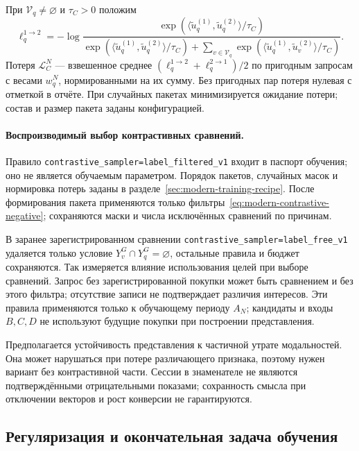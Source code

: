 \documentclass[12pt,a4paper]{article}
\newcommand{\code}[1]{{\ttfamily\small\nolinkurl{#1}}}
\theoremstyle{plainru}
\begin{document}
При $\mathcal V_q\ne\varnothing$ и $\tau_C>0$ положим
\begin{equation}\label{eq:modern-contrastive-loss}
\ell_q^{1\to2}=-\log
\frac{\exp(\langle\tilde u_q^{(1)},\tilde u_q^{(2)}\rangle/\tau_C)}
{\exp(\langle\tilde u_q^{(1)},\tilde u_q^{(2)}\rangle/\tau_C)
+\sum_{v\in\mathcal V_q}
\exp(\langle\tilde u_q^{(1)},\tilde u_v^{(2)}\rangle/\tau_C)}.
\end{equation}
Потеря $\mathcal L_C^N$ --- взвешенное среднее
$(\ell_q^{1\to2}+\ell_q^{2\to1})/2$ по пригодным запросам
с весами $w_q^N$, нормированными на их сумму.
Без пригодных пар потеря нулевая с отметкой в отчёте.
При случайных пакетах минимизируется ожидание потери;
состав и размер пакета заданы конфигурацией.

\paragraph{Воспроизводимый выбор контрастивных сравнений.}
Правило \code{contrastive_sampler=label_filtered_v1} входит в паспорт
обучения; оно не является обучаемым параметром. Порядок пакетов,
случайных масок и нормировка потерь заданы в
разделе~\ref{sec:modern-training-recipe}. После формирования пакета
применяются только фильтры~\eqref{eq:modern-contrastive-negative};
сохраняются маски и числа исключённых сравнений по причинам.

В заранее зарегистрированном сравнении
\code{contrastive_sampler=label_free_v1} удаляется только условие
$Y_v^G\cap Y_q^G=\varnothing$, остальные правила и бюджет сохраняются.
Так измеряется влияние использования целей при выборе сравнений.
Запрос без зарегистрированной покупки может быть сравнением и без этого
фильтра; отсутствие записи не подтверждает различия интересов. Эти правила
применяются только к обучающему периоду $A_N$; кандидаты и входы
$B,C,D$ не используют будущие покупки при построении представления.

Предполагается устойчивость представления к частичной утрате модальностей.
Она может нарушаться при потере различающего признака, поэтому нужен
вариант без контрастивной части. Сессии в знаменателе не являются
подтверждёнными отрицательными показами; сохранность смысла при отключении
векторов и рост конверсии не гарантируются.

\subsection{Регуляризация и окончательная задача обучения}
\label{sec:modern-training}
\end{document}
